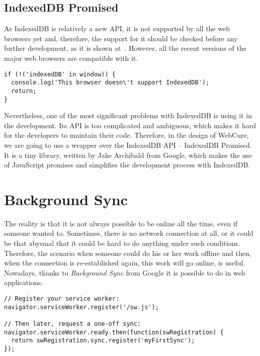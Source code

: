\subsection{IndexedDB Promised}

As IndexedDB is relatively a new API, it is not supported by all the web browsers yet and, therefore, the support for it should be checked before any further development, as it is shown at~. However, all the recent versions of the major web browsers are compatible with it. 

\begin{lstlisting}[caption={An example code, which demonstrates how one can check the support for IndexedDB API\cite{35}.}, label={lst:tech7}]
if (!('indexedDB' in window)) {
  console.log('This browser doesn\'t support IndexedDB');
  return;
}
\end{lstlisting}

Nevertheless, one of the most significant problems with IndexedDB is using it in the development. Its API is too complicated and ambiguous, which makes it hard for the developers to maintain their code. Therefore, in the design of WebCure, we are going to use a wrapper over the IndexedDB API -- IndexedDB Promised\cite{36}. It is a tiny library, written by Jake Archibald from Google, which makes the use of JavaScript promises and simplifies the development process with IndexedDB.

\section{Background Sync}

The reality is that it is not always possible to be online all the time, even if someone wanted to. Sometimes, there is no network connection at all, or it could be that abysmal that it could be hard to do anything under such conditions. Therefore, the scenario when someone could do his or her work offline and then, when the connection is re-established again, this work will go online, is useful. Nowadays, thanks to \textit{Background Sync}\cite{38} from Google it is possible to do in web applications. 

\begin{lstlisting}[caption={An example code, which demonstrates how to register a sync (\textit{myFirstSync} here) event for the service worker\cite{38}.}, label={lst:tech8}]
// Register your service worker:
navigator.serviceWorker.register('/sw.js');

// Then later, request a one-off sync:
navigator.serviceWorker.ready.then(function(swRegistration) {
  return swRegistration.sync.register('myFirstSync');
});
\end{lstlisting} 

